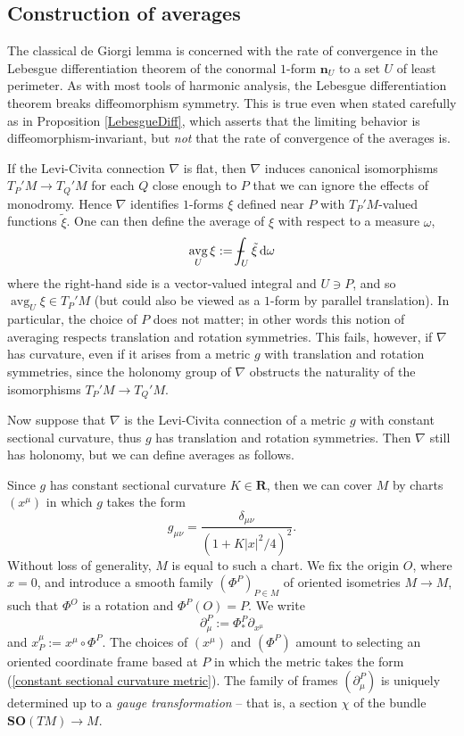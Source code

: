 \documentclass[final,12pt, leqno]{brownthesis}
\newcommand{\RR}{\mathbf{R}}
\newcommand{\SpOrth}{\mathbf{SO}}
\DeclareMathOperator{\avg}{avg}
\newcommand*\dif{\mathop{}\!\mathrm{d}}
\newcommand{\normal}{\mathbf n}
\newcommand{\dfn}[1]{\emph{#1}\index{#1}}
\theoremstyle{definition}
\numberwithin{equation}{section}
\def\Xint#1{\mathchoice
{\XXint\displaystyle\textstyle{#1}}%
{\XXint\textstyle\scriptstyle{#1}}%
{\XXint\scriptstyle\scriptscriptstyle{#1}}%
{\XXint\scriptscriptstyle\scriptscriptstyle{#1}}%
\!\int}
\def\XXint#1#2#3{{\setbox0=\hbox{$#1{#2#3}{\int}$ }
\vcenter{\hbox{$#2#3$ }}\kern-.6\wd0}}
\def\dashint{\Xint-}
\begin{document}
\subsection{Construction of averages}
The classical de Giorgi lemma is concerned with the rate of convergence in the Lebesgue differentiation theorem of the conormal $1$-form $\normal_U$ to a set $U$ of least perimeter.
As with most tools of harmonic analysis, the Lebesgue differentiation theorem breaks diffeomorphism symmetry.
This is true even when stated carefully as in Proposition \ref{LebesgueDiff}, which asserts that the limiting behavior is diffeomorphism-invariant, but \emph{not} that the rate of convergence of the averages is.

If the Levi-Civita connection $\nabla$ is flat, then $\nabla$ induces canonical isomorphisms $T_P'M \to T_Q'M$ for each $Q$ close enough to $P$ that we can ignore the effects of monodromy.
Hence $\nabla$ identifies $1$-forms $\xi$ defined near $P$ with $T_P'M$-valued functions $\tilde \xi$.
One can then define the average of $\xi$ with respect to a measure $\omega$,
\begin{equation}\label{averages and flat connections}
\avg_U \xi := \dashint_U \tilde \xi \dif \omega
\end{equation}
where the right-hand side is a vector-valued integral and $U \ni P$, and so $\avg_U \xi \in T_P'M$ (but could also be viewed as a $1$-form by parallel translation).
In particular, the choice of $P$ does not matter; in other words this notion of averaging respects translation and rotation symmetries.
This fails, however, if $\nabla$ has curvature, even if it arises from a metric $g$ with translation and rotation symmetries, since the holonomy group of $\nabla$ obstructs the naturality of the isomorphisms $T_P'M \to T_Q'M$.

Now suppose that $\nabla$ is the Levi-Civita connection of a metric $g$ with constant sectional curvature, thus $g$ has translation and rotation symmetries.
Then $\nabla$ still has holonomy, but we can define averages as follows.

Since $g$ has constant sectional curvature $K \in \RR$, then we can cover $M$ by charts $(x^\mu)$ in which $g$ takes the form
\begin{equation}\label{constant sectional curvature metric}
g_{\mu\nu} = \frac{\delta_{\mu\nu}}{(1 + K|x|^2/4)^2}.
\end{equation}
Without loss of generality, $M$ is equal to such a chart.
We fix the origin $O$, where $x = 0$, and introduce a smooth family $(\Phi^P)_{P \in M}$ of oriented isometries $M \to M$, such that $\Phi^O$ is a rotation and $\Phi^P(O) = P$.
We write
$$\partial^P_\mu := \Phi^P_* \partial_{x^\mu}$$
and $x^\mu_P := x^\mu \circ \Phi^P$.
The choices of $(x^\mu)$ and $(\Phi^P)$ amount to selecting an oriented coordinate frame based at $P$ in which the metric takes the form (\ref{constant sectional curvature metric}).
The family of frames $(\partial^P_\mu)$ is uniquely determined up to a \dfn{gauge transformation} -- that is, a section $\chi$ of the bundle $\SpOrth(TM) \to M$.
\end{document}
